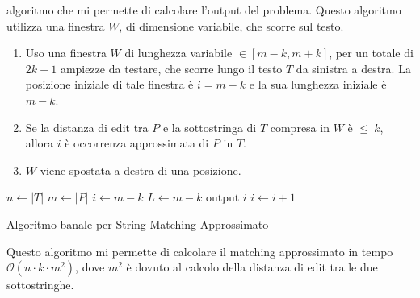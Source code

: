 algoritmo che mi permette di calcolare l'output del problema. Questo algoritmo
 utilizza una finestra $W$, di dimensione variabile, che scorre sul testo.
\begin{enumerate}
    \item Uso una finestra $W$ di lunghezza variabile $\in [m - k, m + k]$, per 
    un totale di $2k+1$ ampiezze da testare, che scorre lungo il testo $T$ da
     sinistra a destra. La posizione iniziale di tale finestra è $i = m - k$ e 
     la sua lunghezza iniziale è $m - k$.
    \item Se la distanza di edit tra $P$ e la sottostringa di $T$ compresa in $W$
     è $\leq \ k$, allora $i$ è occorrenza approssimata di $P$ in $T$.
    \item $W$ viene spostata a destra di una posizione.
\end{enumerate}
\begin{algorithm}
    \begin{algorithmic}
        \State $n\gets |T|$
        \State $m \gets |P|$
        \State $i\gets m - k$
        \State $L \gets  m - k$
        \State $\text{output } i$
        \EndIf
        \EndWhile
        \State $i \gets i + 1$
        \EndWhile
        \EndFunction
    \end{algorithmic}
    \caption{Algoritmo banale per String Matching Approssimato}
\end{algorithm}

Questo algoritmo mi permette di calcolare il matching approssimato in tempo
$\mathcal{O}(n \cdot k \cdot m^2)$, dove $m^2$ è dovuto al calcolo della distanza
di edit tra le due sottostringhe.
